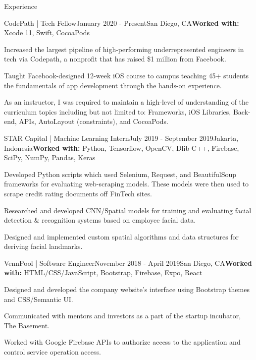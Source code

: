 \documentclass{resume} %
\begin{document}

\begin{rSection}{\faCode{ }}{Experience}

\begin{rSubsection}{}{CodePath | {\normalfont Tech Fellow}}{January 2020 - Present}{}{San Diego, CA}{\textbf{Worked with:} Xcode 11, Swift, CocoaPods }
\item Increased the largest pipeline of high-performing underrepresented engineers in tech via
Codepath, a nonprofit that has raised \$1 million from Facebook.
\item Taught Facebook-designed 12-week iOS course to campus teaching 45+ students the
fundamentals of app development through the hands-on experience.
\item As an instructor, I was required to maintain a high-level of understanding of the curriculum topics including but not limited to: Frameworks, iOS Libraries, Back-end, APIs, AutoLayout (constraints), and CocoaPods.
\end{rSubsection}

\begin{rSubsection}{}{STAR Capital | {\normalfont Machine Learning Intern}}{July 2019 - September 2019}{}{Jakarta, Indonesia}{\textbf{Worked with:} Python, Tensorflow, OpenCV, Dlib C++, Firebase, SciPy, NumPy, Pandas, Keras}
\item Developed Python scripts which used Selenium, Request, and BeautifulSoup frameworks for evaluating web-scraping models. These models were then used to scrape credit rating documents off FinTech sites.
\item Researched and developed CNN/Spatial models for training and evaluating facial detection \& recognition systems based on employee facial data. 
\item Designed	and	implemented custom spatial algorithms and data structures for deriving facial landmarks.
\end{rSubsection}

\begin{rSubsection}{}{VennPool | {\normalfont Software Engineer}}{November 2018 - April 2019}{}{San Diego, CA}{\textbf{Worked with:} HTML/CSS/JavaScript, Bootstrap, Firebase, Expo, React}
\item Designed and developed the company website’s interface using Bootstrap themes and CSS/Semantic UI.
\item Communicated with mentors and investors as a part of the startup incubator, The Basement.
\item Worked with Google Firebase APIs to authorize access to the application and control service operation access.
\end{rSubsection}

\end{rSection}
\end{document}

